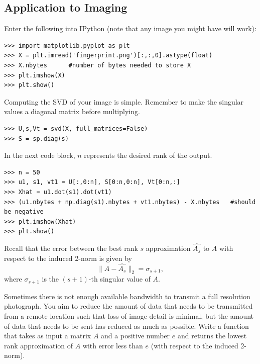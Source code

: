 \subsection*{Application to Imaging}
Enter the following into IPython (note that any image you might have will work):
\begin{lstlisting}
>>> import matplotlib.pyplot as plt
>>> X = plt.imread('fingerprint.png')[:,:,0].astype(float)
>>> X.nbytes      #number of bytes needed to store X
>>> plt.imshow(X)
>>> plt.show()
\end{lstlisting}
Computing the SVD of your image is simple.
Remember to make the singular values a diagonal matrix before multiplying.
\begin{lstlisting}
>>> U,s,Vt = svd(X, full_matrices=False)
>>> S = sp.diag(s)
\end{lstlisting}
In the next code block, $n$ represents the desired rank of the output.
\begin{lstlisting}
>>> n = 50
>>> u1, s1, vt1 = U[:,0:n], S[0:n,0:n], Vt[0:n,:]
>>> Xhat = u1.dot(s1).dot(vt1)
>>> (u1.nbytes + np.diag(s1).nbytes + vt1.nbytes) - X.nbytes   #should be negative
>>> plt.imshow(Xhat)
>>> plt.show()
\end{lstlisting}
Recall that the error between the best rank $s$ approximation $\widehat{A_s}$ to $A$ with respect to the induced 
2-norm is given by
$$
\|A - \widehat{A_s}\|_2 = \sigma_{s+1},
$$
where $\sigma_{s+1}$ is the $(s+1)$-th singular value of $A$. 

\begin{problem}
Sometimes there is not enough available bandwidth to transmit a full resolution photograph.
You aim to reduce the amount of data that needs to be transmitted from a remote location such that loss of image detail is minimal, but the amount of data that needs to be sent has reduced as much as possible.
Write a function  that takes as input a matrix $A$ and a positive number $e$ and returns
the lowest rank approximation of $A$ with error less than $e$ (with respect to the induced 2-norm).
\end{problem}
